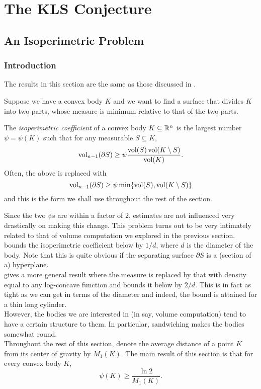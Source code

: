 \section{The KLS Conjecture}

\subsection{An Isoperimetric Problem}

\subsubsection{Introduction}

The results in this section are the same as those discussed in \cite{KLSConjecture}.

Suppose we have a convex body $K$ and we want to find a surface that divides $K$ into two parts, whose measure is minimum relative to that of the two parts.

\begin{fdef}
	\label{def: isoperimetric coefficient}
	The \textit{isoperimetric coefficient} of a convex body $K\subseteq\mathbb{R}^n$ is the largest number $\psi=\psi(K)$ such that for any measurable $S\subseteq K$,
	\[ \operatorname{vol}_{n-1}(\partial S) \geq \psi \frac{\operatorname{vol}(S)\operatorname{vol}(K\setminus S)}{\operatorname{vol}(K)}. \]
	Often, the above is replaced with
	\[ \operatorname{vol}_{n-1}(\partial S) \geq \psi \min\{\operatorname{vol}(S), \operatorname{vol}(K\setminus S)\} \]
	and this is the form we shall use throughout the rest of the section.
\end{fdef}

Since the two $\psi$s are within a factor of $2$, estimates are not influenced very drastically on making this change. This problem turns out to be very intimately related to that of volume computation we explored in the previous section.\\
\cite{lovasz-simonovits-mixing-rate-isoperimetric} bounds the isoperimetric coefficient below by $1/d$, where $d$ is the diameter of the body. Note that this is quite obvious if the separating surface $\partial S$ is a (section of a) hyperplane.\\
\cite{applegate-kannan-cube-sandwich} gives a more general result where the measure is replaced by that with density equal to any log-concave function and bounds it below by $2/d$. This is in fact as tight as we can get in terms of the diameter and indeed, the bound is attained for a thin long cylinder.\\
However, the bodies we are interested in (in say, volume computation) tend to have a certain structure to them. In particular, sandwiching makes the bodies somewhat round.\\
Throughout the rest of this section, denote the average distance of a point $K$ from its center of gravity by $M_1(K)$. The main result of this section is that for every convex body $K$,
\[ \psi(K) \geq \frac{\ln 2}{M_1(K)}. \]

